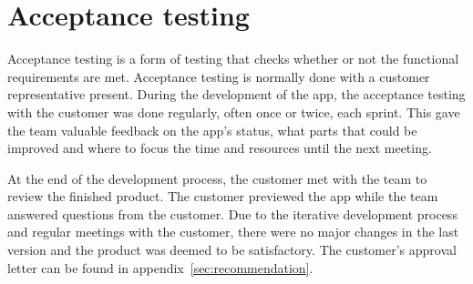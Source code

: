 \section{Acceptance testing}
\label{sec:acceptance}
Acceptance testing is a form of testing that checks whether or not the functional requirements are met. Acceptance testing is normally done with a customer representative present. During the development of the app, the acceptance testing with the customer was done regularly, often once or twice, each sprint. This gave the team valuable feedback on the app's status, what parts that could be improved and where to focus the time and resources until the next meeting.

At the end of the development process, the customer met with the team to review the finished product. The customer previewed the app while the team answered questions from the customer. Due to the iterative development process and regular meetings with the customer, there were no major changes in the last version and the product was deemed to be satisfactory. The customer's approval letter can be found in appendix~\ref{sec:recommendation}.